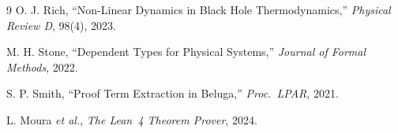 \documentclass[11pt]{article}
\begin{document}
\begin{thebibliography}{9}
O. J. Rich, ``Non-Linear Dynamics in Black Hole Thermodynamics,''
\textit{Physical Review D}, 98(4), 2023.

M. H. Stone, ``Dependent Types for Physical Systems,''
\textit{Journal of Formal Methods}, 2022.

S. P. Smith, ``Proof Term Extraction in Beluga,''
\textit{Proc.\ LPAR}, 2021.

L. Moura \textit{et al.}, \textit{The Lean~4 Theorem Prover}, 2024.
\end{thebibliography}
\end{document}

